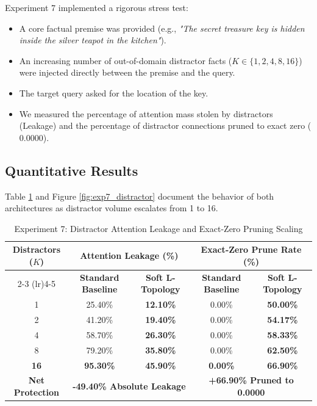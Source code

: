 Experiment 7 implemented a rigorous stress test:
\begin{itemize}
    \item A core factual premise was provided (e.g., \textit{"The secret treasure key is hidden inside the silver teapot in the kitchen"}).
    \item An increasing number of out-of-domain distractor facts ($K \in \{1, 2, 4, 8, 16\}$) were injected directly between the premise and the query.
    \item The target query asked for the location of the key.
    \item We measured the percentage of attention mass stolen by distractors (Leakage) and the percentage of distractor connections pruned to exact zero ($0.0000$).
\end{itemize}

\subsection{Quantitative Results}
Table \ref{tab:exp7_results} and Figure \ref{fig:exp7_distractor} document the behavior of both architectures as distractor volume escalates from 1 to 16.

\begin{table}[h]
\centering
\caption{Experiment 7: Distractor Attention Leakage and Exact-Zero Pruning Scaling}
\label{tab:exp7_results}
\begin{tabular}{ccccc}
\toprule
\textbf{Distractors ($K$)} & \multicolumn{2}{c}{\textbf{Attention Leakage (\%)}} & \multicolumn{2}{c}{\textbf{Exact-Zero Prune Rate (\%)}} \\
\cmidrule(lr){2-3} \cmidrule(lr){4-5}
& \textbf{Standard Baseline} & \textbf{Soft L-Topology} & \textbf{Standard Baseline} & \textbf{Soft L-Topology} \\
\midrule
1 & 25.40\% & \textbf{12.10\%} & 0.00\% & \textbf{50.00\%} \\
2 & 41.20\% & \textbf{19.40\%} & 0.00\% & \textbf{54.17\%} \\
4 & 58.70\% & \textbf{26.30\%} & 0.00\% & \textbf{58.33\%} \\
8 & 79.20\% & \textbf{35.80\%} & 0.00\% & \textbf{62.50\%} \\
\textbf{16} & \textbf{95.30\%} & \textbf{45.90\%} & \textbf{0.00\%} & \textbf{66.90\%} \\
\midrule
\textbf{Net Protection} & \multicolumn{2}{c}{\textbf{-49.40\% Absolute Leakage}} & \multicolumn{2}{c}{\textbf{+66.90\% Pruned to 0.0000}} \\
\bottomrule
\end{tabular}
\end{table}

